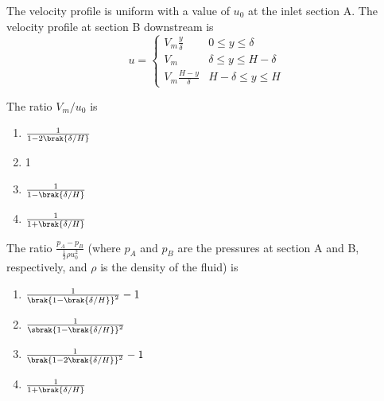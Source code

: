 \begin{center}
\end{center}
The velocity profile is uniform with a value of $u_0$ at the inlet section A. The velocity profile at section B downstream is
\[
u = 
\begin{cases} 
      V_m \frac{y}{\delta} & 0 \leq y \leq \delta \\
      V_m & \delta \leq y \leq H - \delta \\
      V_m \frac{H - y}{\delta} & H - \delta \leq y \leq H 
   \end{cases}
\]

\item The ratio $V_m / u_0$ is

\begin{enumerate}
	\item $\frac{1}{1 - 2\brak{\delta / H}}$
    \item 1
    \item $\frac{1}{1 - \brak{\delta / H}}$
    \item $\frac{1}{1 + \brak{\delta / H}}$
\end{enumerate}

\item The ratio $\frac{p_A - p_B}{\frac{1}{2} \rho u_0^2}$ (where $p_A$ and $p_B$ are the pressures at section A and B, respectively, and $\rho$ is the density of the fluid) is

\begin{enumerate}
	\item $\frac{1}{\brak{ 1 - \brak{\delta / H}}^2} - 1$
	\item $\frac{1}{\sbrak{ 1 - \brak{\delta / H} }^2}$

	\item $\frac{1}{\brak{ 1 - 2\brak{\delta / H}}^2} - 1$
	\item $\frac{1}{1 + \brak{\delta / H}} $
\end{enumerate}
